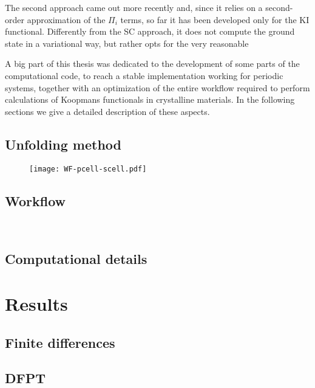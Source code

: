 The second approach came out more recently \cite{colonna_koopmans_2022} and, since it relies on a second-order approximation of the $\Pi_i$ terms, so far it has been developed only for the KI functional. Differently from the SC approach, it does not compute the ground state in a variational way, but rather opts for the very reasonable 

A big part of this thesis was dedicated to the development of some parts of the computational code, to reach a stable implementation working for periodic systems, together with an optimization of the entire workflow required to perform calculations of Koopmans functionals in crystalline materials. In the following sections we give a detailed description of these aspects.


\subsection{Unfolding method\label{sec:unfolding-method}}

\begin{figure}
    \centering
    \texttt{[image: WF-pcell-scell.pdf]}
    \caption[]{}
    \label{fig:map-wf}
\end{figure}


\subsection{Workflow\label{sec:workflow}}

\begin{figure}
    \centering
     \\
    \caption[]{}
    \label{fig:workflow}
\end{figure}

\subsection{Computational details\label{sec:computational-details}}

\section{Results\label{sec:results-bands}}

\subsection{Finite differences\label{sec:results-dscf}}

\subsection{DFPT\label{sec:results-dfpt}}

